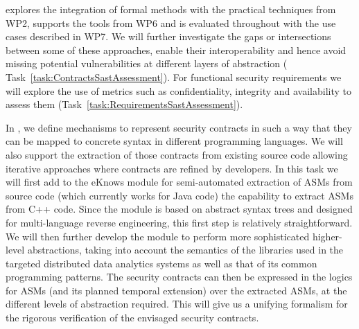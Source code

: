 \begin{Workpackage}{\thewpno}
\begin{WPDescription}
\theWP{} explores the integration of formal methods with the practical techniques from WP2, supports the tools from WP6 and is evaluated throughout with the use cases described in WP7.
We will further investigate the gaps or intersections between some of these approaches, enable their interoperability and hence avoid missing potential vulnerabilities at different layers of abstraction (%
Task~\ref{task:ContractsSastAssessment}). 
For functional security requirements we will explore the use of metrics such as confidentiality, integrity and availability to assess them (Task~\ref{task:RequirementsSastAssessment}).


\end{WPDescription}


\begin{Task}

\TaskResults{%
}
\TaskHeader{}

In \theTask, we define mechanisms to represent security contracts
in such a way that they can be mapped to concrete syntax in different
programming languages. We will also support the extraction of those contracts
from existing source code allowing iterative approaches where contracts
are refined by developers.
In this task we will first add to the \textsf{eKnows} module for semi-automated extraction of ASMs from source code (which currently works for Java code) the capability to extract ASMs from C++ code. Since the module is based on abstract syntax trees and designed for multi-language reverse engineering, this first step is relatively straightforward.
We will then further develop the module to perform more sophisticated higher-level abstractions, taking into account the semantics of the libraries used in the targeted distributed data analytics systems as well as that of its common programming patterns. The security contracts can then be expressed in the logics for ASMs (and its planned temporal extension) over the extracted ASMs, at the different levels of abstraction required. This will give us a unifying formalism for the rigorous verification of the envisaged security contracts.  



\end{Task}
\end{Workpackage}

